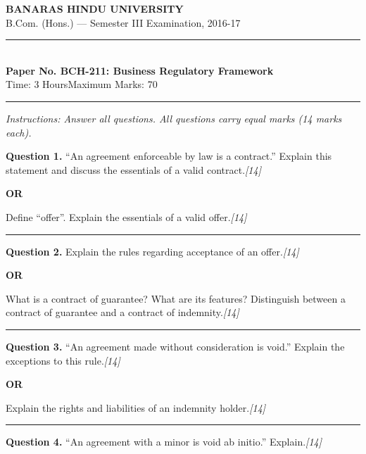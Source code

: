 \documentclass[11pt,a4paper]{article}
\newcommand{\pts}[1]{\hfill   \textit{[#1]}}
\begin{document}
\begin{center}
  {\large\bfseries BANARAS HINDU UNIVERSITY}\\[2pt]
  {\normalsize B.Com. (Hons.) --- Semester III Examination, 2016-17}\\[6pt]
  \rule{0.8\linewidth}{0.5pt}\\[6pt]
  {\large\bfseries Paper No. BCH-211: Business Regulatory Framework}\\[4pt]
  {\normalsize Time: 3 Hours\hfill Maximum Marks: 70}
\end{center}

\rule{\linewidth}{0.4pt}

\smallskip



\noindent   \textit{Instructions: Answer all questions. All questions carry equal marks (14 marks each).}

\bigskip




\noindent   \textbf{Question 1.}
``An agreement enforceable by law is a contract.'' Explain this statement and discuss the essentials of a valid contract.\pts{14}

\centerline{   \textbf{OR}}

Define ``offer''. Explain the essentials of a valid offer.\pts{14}

\medskip\rule{\linewidth}{0.2pt}




\noindent   \textbf{Question 2.}
Explain the rules regarding acceptance of an offer.\pts{14}

\centerline{   \textbf{OR}}

What is a contract of guarantee? What are its features? Distinguish between a contract of guarantee and a contract of indemnity.\pts{14}

\medskip\rule{\linewidth}{0.2pt}




\noindent   \textbf{Question 3.}
``An agreement made without consideration is void.'' Explain the exceptions to this rule.\pts{14}

\centerline{   \textbf{OR}}

Explain the rights and liabilities of an indemnity holder.\pts{14}

\medskip\rule{\linewidth}{0.2pt}




\noindent   \textbf{Question 4.}
``An agreement with a minor is void ab initio.'' Explain.\pts{14}
\end{document}
